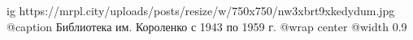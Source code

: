  
 
 
 
 

\ifcmt
  ig https://mrpl.city/uploads/posts/resize/w/750x750/nw3xbrt9xkedydum.jpg
	@caption Библиотека им. Короленко с 1943 по 1959 г.
  @wrap center
  @width 0.9
\fi
